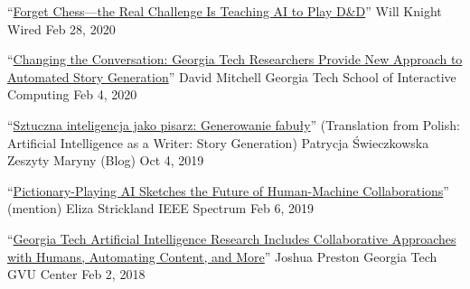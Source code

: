   \cvmedia
    {``\href{https://www.wired.com/story/forget-chess-real-challenge-teaching-ai-play-dandd/}{Forget Chess---the Real Challenge Is Teaching AI to Play D\&D}''} %
    {Will Knight} %
    {Wired} %
    {Feb 28, 2020} %

  \cvmedia
    {``\href{https://www.ic.gatech.edu/news/632082/changing-conversation-georgia-tech-researchers-provide-new-approach-automated-story}{Changing the Conversation: Georgia Tech Researchers Provide New Approach to Automated Story Generation}''} %
    {David Mitchell} %
    {Georgia Tech School of Interactive Computing} %
    {Feb 4, 2020} %

  \cvmedia
    {``\href{https://zeszytymaryny.pl/naukowo/sztuczna-inteligencja-jako-pisarz-generowanie-fabuly/}{Sztuczna inteligencja jako pisarz: Generowanie fabuły}'' \newline (Translation from Polish: Artificial Intelligence as a Writer: Story Generation)} %
    {Patrycja Świeczkowska} %
    {Zeszyty Maryny (Blog)} %
    {Oct 4, 2019} %


  \cvmedia
    {``\href{https://spectrum.ieee.org/tech-talk/robotics/artificial-intelligence/pictionary-playing-ai-sketches-the-future-of-human-machine-collaborations}{Pictionary-Playing AI Sketches the Future of Human-Machine Collaborations}'' (mention)} %
    {Eliza Strickland} %
    {IEEE Spectrum} %
    {Feb 6, 2019} %


  \cvmedia
    {``\href{https://gvu.gatech.edu/georgia-tech-aaai2018}{Georgia Tech Artificial Intelligence Research Includes Collaborative Approaches with Humans, Automating Content, and More}''} %
    {Joshua Preston} %
    {Georgia Tech GVU Center} %
    {Feb 2, 2018} %




